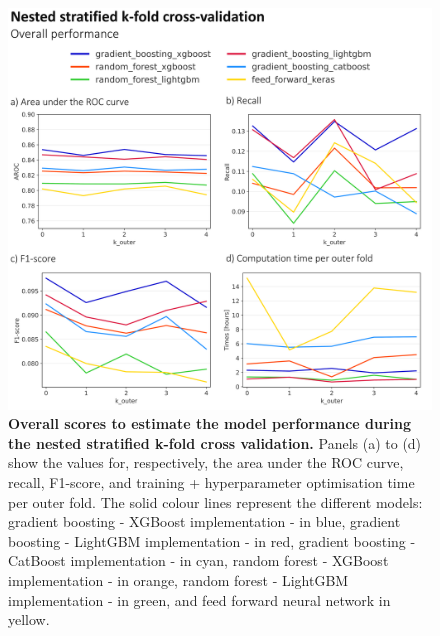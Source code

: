 \begin{figure}[htbp]
\centering
\includegraphics[width=\textwidth]{hydro_based_ff_cross_validation_optuna_overall_scores.png}
\caption{\textbf{Overall scores to estimate the model performance during the nested stratified k-fold cross validation.} Panels (a) to (d) show the values for, respectively, the area under the ROC curve, recall, F1-score, and training + hyperparameter optimisation time per outer fold. The solid colour lines represent the different models: gradient boosting - XGBoost implementation - in blue, gradient boosting - LightGBM implementation - in red, gradient boosting - CatBoost implementation - in cyan, random forest - XGBoost implementation - in orange, random forest - LightGBM implementation - in green, and feed forward neural network in yellow.}
\label{fig:hydro_based_ff_cross_validation_optuna_overall_scores}
\end{figure}

